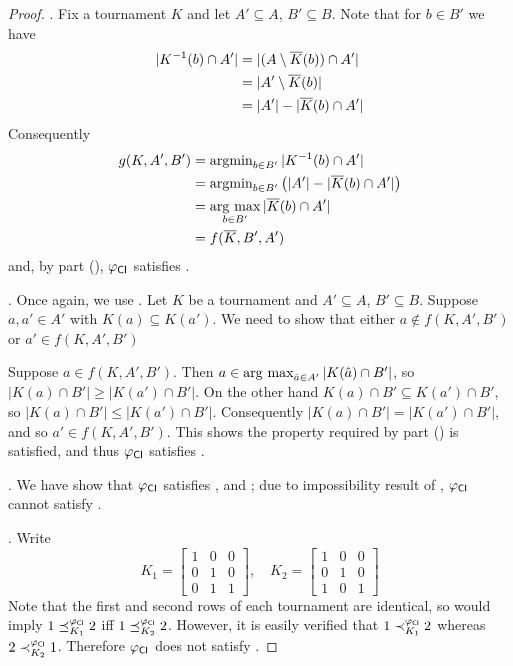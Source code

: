 \begin{proof}
    \dualaxiom{}. Fix a tournament $K$ and let $A' \subseteq A$, $B'
    \subseteq B$. Note that for $b \in B'$ we have
    \begin{align*}
        |K^{-1}(b) \cap A'|
        &= |(A \setminus {\overline{K}}(b)) \cap A'| \\
        &= |A' \setminus {\overline{K}}(b)| \\
        &= |A'| - |{\overline{K}}(b) \cap A'|
    \end{align*}
    Consequently
    \begin{align*}
        g(K, A', B')
        &= \operatorname{argmin}_{b \in B'}{|K^{-1}(b) \cap A'|} \\
        &= \operatorname{argmin}_{b \in B'}{\left(|A'| - |{\overline{K}}(b) \cap A'|\right)} \\
        &= \operatorname*{arg\ max}_{b \in B'}{|{\overline{K}}(b) \cap A'|} \\
        &= f({\overline{K}}, B', A')
    \end{align*}
    and, by  part
    (), ${\varphi_{\mathsf{CI}}}$ satisfies
    \dualaxiom{}.

    \mon{}. Once again, we use
    .  Let $K$ be a tournament and $A'
    \subseteq A$, $B' \subseteq B$. Suppose $a, a' \in A'$ with $K(a) \subseteq
    K(a')$. We need to show that either $a \not\in f(K, A', B')$ or $a' \in
    f(K, A', B')$

    Suppose $a \in f(K, A', B')$. Then $a \in \operatorname*{arg\ max}_{\hat{a} \in
    A'}{|K(\hat{a}) \cap B'|}$, so $|K(a) \cap B'| \ge |K(a') \cap B'|$. On the
    other hand $K(a) \cap B' \subseteq K(a') \cap B'$, so $|K(a) \cap B'| \le
    |K(a') \cap B'|$.  Consequently $|K(a) \cap B'| = |K(a') \cap B'|$, and so
    $a' \in f(K, A', B')$. This shows the property required by
     part
    () is satisfied, and thus ${\varphi_{\mathsf{CI}}}$
    satisfies \mon{}.

    \posresp{}. We have show that ${\varphi_{\mathsf{CI}}}$ satisfies
    \chaindef{}, \anon{} and \dualaxiom{}; due to
    impossibility result of , ${\varphi_{\mathsf{CI}}}$
    cannot satisfy \posresp{}.

    \iim{}. Write
    \[
        K_1 = \begin{bmatrix}
            1 & 0 & 0 \\
            0 & 1 & 0 \\
            0 & 1 & 1
        \end{bmatrix}
        , \quad
        K_2 = \begin{bmatrix}
            1 & 0 & 0 \\
            0 & 1 & 0 \\
            1 & 0 & 1
        \end{bmatrix}
    \]
    Note that the first and second rows of each tournament are identical, so
    \iim{} would imply $1 \preceq_{K_1}^{\varphi_{\mathsf{CI}}} 2$ iff $1
    \preceq_{K_2}^{\varphi_{\mathsf{CI}}} 2$.  However, it is easily verified that $1
    \prec_{K_1}^{\varphi_{\mathsf{CI}}} 2$ whereas $2 \prec_{K_2}^{\varphi_{\mathsf{CI}}} 1$. Therefore
    ${\varphi_{\mathsf{CI}}}$ does not satisfy \iim{}.
\end{proof}

